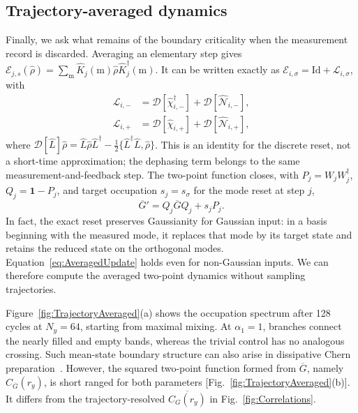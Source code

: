 \documentclass[aps,prb,10pt,twocolumn,superscriptaddress,longbibliography,floatfix]{revtex4-2}
\newcommand{\mc}[1]{\mathcal{#1}}
\newcommand{\Id}{\mathbf{1}}
\newcommand{\claudeadd}[1]{{\color{orange}#1}}
\begin{document}
{\color{blue}
\subsection{Trajectory-averaged dynamics}
\label{sec:TrajectoryAveraged}

Finally, we ask what remains of the boundary criticality when the measurement record is discarded. Averaging an elementary step gives $\mc E_{j,s}(\hat\rho)=\sum_{\mathrm m}\hat K_j(\mathrm m)\hat\rho\hat K_j^\dagger(\mathrm m)$. It can be written exactly as $\mc E_{i,\sigma}=\mathrm{Id}+\mc L_{i,\sigma}$, with
\begin{align}
 \mc L_{i,-}&=\mc D[\hat\chi_{i,-}^\dagger]+\mc D[\hat{\mc N}_{i,-}],\nonumber\\
 \mc L_{i,+}&=\mc D[\hat\chi_{i,+}]+\mc D[\hat{\mc N}_{i,+}],
 \label{eq:AveragedChannel}
\end{align}
where $\mc D[\hat L]\hat\rho=\hat L\hat\rho\hat L^\dagger-\tfrac12\{\hat L^\dagger\hat L,\hat\rho\}$. This is an identity for the discrete reset, not a short-time approximation; the dephasing term belongs to the same measurement-and-feedback step. The two-point function closes, with \claudeadd{$P_j=W_jW_j^\dagger$}, $Q_j=\Id-P_j$, and target occupation $s_j=s_\sigma$ for the mode reset at step $j$,
\begin{equation}
 \overline G'=Q_j\overline GQ_j+s_jP_j.
 \label{eq:AveragedUpdate}
\end{equation}
In fact, the exact reset preserves Gaussianity for Gaussian input: in a basis beginning with the measured mode, it replaces that mode by its target state and retains the reduced state on the orthogonal modes. Equation~\eqref{eq:AveragedUpdate} holds even for non-Gaussian inputs. We can therefore compute the averaged two-point dynamics without sampling trajectories.

Figure~\ref{fig:TrajectoryAveraged}(a) shows the occupation spectrum after 128 cycles at $N_y=64$, starting from maximal mixing. At $\alpha_1=1$, branches connect the nearly filled and empty bands, whereas the trivial control has no analogous crossing. Such mean-state boundary structure can also arise in dissipative Chern preparation~\cite{Goldstein2019}. However, the squared two-point function formed from $\overline G$, namely $C_{\overline G}(r_y)$, is short ranged for both parameters [Fig.~\ref{fig:TrajectoryAveraged}(b)]. It differs from the trajectory-resolved $\overline{C_G(r_y)}$ in Fig.~\ref{fig:Correlations}.

}
\end{document}
